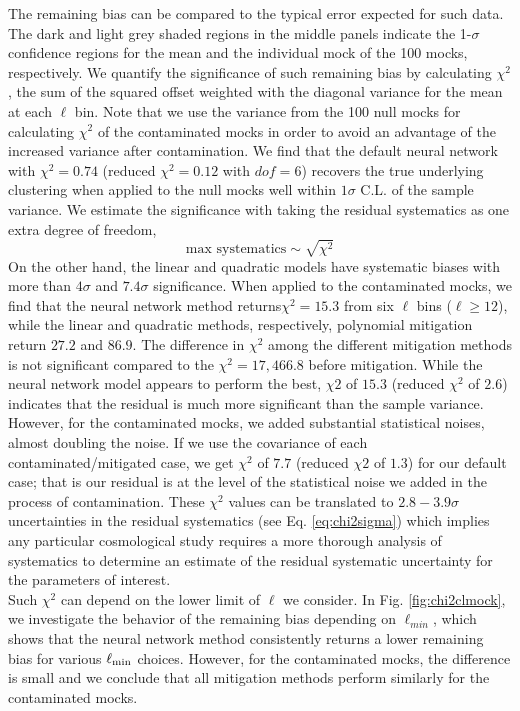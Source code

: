 The remaining bias can be compared to the typical error expected for such data. The dark and light grey shaded regions in the middle panels indicate the 1-$\sigma$ confidence regions for the mean and the individual mock of the 100 mocks, respectively.  We quantify the significance of such remaining bias by calculating $\chi^2$, the sum of the squared offset weighted with the diagonal variance for the mean at each $\ell$ bin. Note that we use the variance from the 100 null mocks for calculating $\chi^2$ of the contaminated mocks in order to avoid an advantage of the increased variance after contamination. We find that the default neural network with $\chi^{2}=0.74$ (reduced $\chi^{2} = 0.12 $ with $dof=6$) recovers the true underlying clustering when applied to the null mocks well within $1\sigma$ C.L. of the sample variance. We estimate the significance with taking the residual systematics as one extra degree of freedom,
\begin{equation}\label{eq:chi2sigma}
 \text{max systematics} \sim \sqrt{\chi^{2}}
\end{equation}
On the other hand, the linear and quadratic models have systematic biases with more than $4\sigma$ and $7.4\sigma$ significance. When applied to the contaminated mocks, we find that the neural network method returns$\chi^2=15.3$ from six $\ell$ bins ($\ell \geq 12$), while the linear and quadratic methods, respectively, polynomial mitigation return $27.2$ and $86.9$. The difference in $\chi^2$ among the different mitigation methods is not significant compared to the $\chi^2=17,466.8$ before mitigation. While the neural network model appears to perform the best, $\chi2$ of $15.3$ (reduced $\chi^2$ of $2.6$) indicates that the residual is much more significant than the sample variance. However, for the contaminated mocks, we added substantial statistical noises, almost doubling the noise. If we use the covariance of each contaminated/mitigated case, we get $\chi^2$ of $7.7$ (reduced $\chi2$ of $1.3$) for our default case; that is our residual is at the level of the statistical noise we added in the process of contamination. These $\chi^{2}$ values can be translated to $2.8-3.9\sigma$ uncertainties in the residual systematics (see Eq. \ref{eq:chi2sigma}) which implies any particular cosmological study requires a more thorough analysis of systematics to determine an estimate of the residual systematic uncertainty for the parameters of interest.\\

Such $\chi^2$ can depend on the lower limit of $\ell$ we consider. In Fig. \ref{fig:chi2clmock}, we investigate the behavior of the remaining bias depending on $\ell_{min}$, which shows that the neural network method consistently returns a lower remaining bias for various $\ell_{\rm min}$ choices. However, for the contaminated mocks, the difference is small and we conclude that all mitigation methods perform similarly for the contaminated mocks.\\


